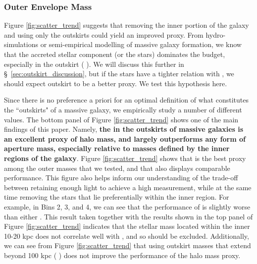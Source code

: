 \documentclass[fleqn,usenatbib,useAMS]{mnras}
\begin{document}
\subsubsection{Outer Envelope Mass}
    \label{sec:m100_outskirt}

    Figure \ref{fig:scatter_trend} suggests that removing the inner portion of the galaxy and using
    only the outskirts could yield an improved \mvir{} proxy.
    From hydro-simulations or semi-empirical modelling of massive galaxy formation, we know that the
    accreted stellar component (or the \exsitu{} stars) dominates the \mstar{} budget, especially in
    the outskirt (\eg{} \citealt{RodriguezGomez2016}). 
    We will discuss this further in \S\ \ref{sec:outskirt_discussion}, but if the \exsitu{} stars
    have a tighter relation with \mvir{}, we should expect outskirt \mstar{} to be a better \mvir{}
    proxy. We test this hypothesis here.  

    Since there is no preference a priori for an optimal definition of what constitutes the
    ``outskirts" of a massive galaxy, we empirically study a number of different values. 
    The bottom panel of Figure \ref{fig:scatter_trend} shows one of the main findings of this paper. 
    Namely, \textbf{the \mstar{} in the outskirts of massive galaxies is an excellent proxy of halo mass,
    and largely outperforms any form of aperture mass, especially relative to masses defined by the
    inner regions of the galaxy}.
    Figure \ref{fig:scatter_trend} shows that  is the best \mvir{} proxy among the
    outer masses that we tested, and that  also displays comparable performance. 
    This figure also helps inform our understanding of the trade-off between retaining enough light
    to achieve a high \snratio{} measurement, while at the same time removing the \insitu{} stars
    that lie preferentially within the inner region. 
    For example, in Bins 2, 3, and 4, we can see that the performance of  is slightly
    worse than either  . 
    This result taken together with the results shown in the top panel of Figure
    \ref{fig:scatter_trend} indicates that the stellar mass located within the inner 10-20 kpc does
    not correlate well with \mvir{}, and so should be excluded.
    Additionally, we can see from Figure \ref{fig:scatter_trend} that using outskirt masses that
    extend beyond 100 kpc (\eg{} ) does not improve the performance of the halo mass
    proxy.
    
\end{document}
